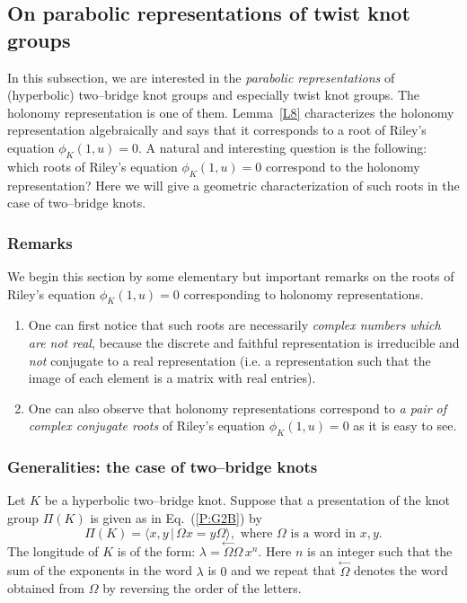 \documentclass[a4paper]{amsart}
\theoremstyle{plain}
\theoremstyle{definition}
\theoremstyle{remark}
\newtheorem{remark}{Remark}%
\begin{document}
\subsection{On parabolic representations of twist knot groups}
\label{ParRep}

In this subsection, we are interested in the \emph{parabolic representations} of (hyperbolic) two--bridge knot groups and especially twist knot groups. The holonomy representation is one of them. Lemma~\ref{L8} characterizes the holonomy representation algebraically and says that it corresponds to a root of Riley's equation $\phi_K(1,u) = 0$. A natural and interesting question is the following: which roots of Riley's equation $\phi_K(1,u) = 0$ correspond to the holonomy representation? Here we will give a geometric characterization of such roots {in the case of two--bridge knots}.

\subsubsection{Remarks}
We begin this section by some elementary but important remarks on the roots of Riley's equation $\phi_K(1,u) = 0$ corresponding to holonomy  representations.
\begin{enumerate}
  \item One can first notice that such roots are necessarily \emph{complex numbers which are not real}, because the discrete and faithful representation is irreducible and \emph{not} conjugate to a real representation (i.e. a representation such that the image of each element is a matrix with real entries).
  \item One can also observe that holonomy representations correspond to \emph{a pair of complex conjugate roots} of  Riley's equation $\phi_K(1,u) = 0$ as it is easy to see.
\end{enumerate}

\subsubsection{Generalities: the case of two--bridge knots}
Let $K$ be a hyperbolic two--bridge knot.
Suppose that a presentation of the knot group $\Pi(K)$ is given as in Eq.~(\ref{P:G2B}) by
\[
\Pi(K) = \langle {x, y \, |\, \Omega x = y\Omega} \rangle, \text{ where } \Omega \text{ is a word in } x,y. 
\]
The longitude of $K$ is of the form: $\lambda = \stackrel{\gets}{\Omega}\Omega \, x^n$. Here $n$ is an integer such that 
the sum of the exponents in the word $\lambda$ is $0$ and we repeat that $\stackrel{\gets}{\Omega}$ denotes the word obtained from $\Omega$ by reversing the order of the letters.
\end{document}

